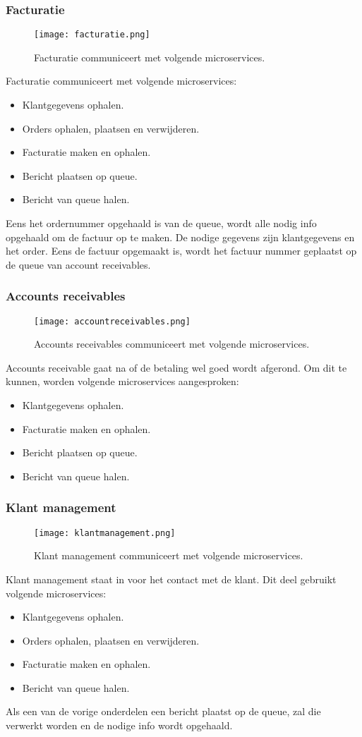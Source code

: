 \subsubsection{Facturatie}
\begin{figure}[h]
	\texttt{[image: facturatie.png]}
	\caption{Facturatie communiceert met volgende microservices.}
	\centering
\end{figure}
Facturatie communiceert met volgende microservices:
\begin{itemize}
	\item Klantgegevens ophalen.
	\item Orders ophalen, plaatsen en verwijderen.
	\item Facturatie maken en ophalen.
	\item Bericht plaatsen op queue.
	\item Bericht van queue halen.
\end{itemize}
Eens het ordernummer opgehaald is van de queue, wordt alle nodig info opgehaald om de factuur op te maken. De nodige gegevens zijn klantgegevens en het order. Eens de factuur opgemaakt is, wordt het factuur nummer geplaatst op de queue van account receivables.

\subsubsection{Accounts receivables}
\begin{figure}[h]
	\texttt{[image: accountreceivables.png]}
	\caption{Accounts receivables communiceert met volgende microservices.}
	\centering
\end{figure}
Accounts receivable gaat na of de betaling wel goed wordt afgerond. Om dit te kunnen, worden volgende microservices aangesproken:
\begin{itemize}
	\item Klantgegevens ophalen.
	\item Facturatie maken en ophalen.
	\item Bericht plaatsen op queue.
	\item Bericht van queue halen.
\end{itemize}

\subsubsection{Klant management}
\begin{figure}[h]
	\texttt{[image: klantmanagement.png]}
	\caption{Klant management communiceert met volgende microservices.}
	\centering
\end{figure}
Klant management staat in voor het contact met de klant. Dit deel gebruikt volgende microservices:
\begin{itemize}
	\item Klantgegevens ophalen.
	\item Orders ophalen, plaatsen en verwijderen.
	\item Facturatie maken en ophalen.
	\item Bericht van queue halen.
\end{itemize}
Als een van de vorige onderdelen een bericht plaatst op de queue, zal die verwerkt worden en de nodige info wordt opgehaald.

